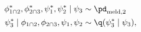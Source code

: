 \begin{align}
  \phi_{1 \cap 2}^{*}, \phi_{2 \cap 3}^{*}, \psi_{1}^{*}, \psi_{2}^{*} \mid \psi_{3} 
    &\sim 
    \pd_{\text{meld}, 2}
  \\
  \psi_{3}^{*} \mid \phi_{1 \cap 2}, \phi_{2 \cap 3}, \psi_{1}, \psi_{2} 
    &\sim
    \q(\psi_{3}^{*} \mid \psi_{3}),
  \label{eqn:stage-three-gibbs-updates}
\end{align}